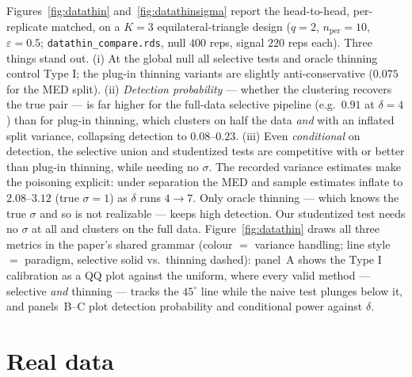 \documentclass[11pt]{article}
\begin{document}
Figures~\ref{fig:datathin} and~\ref{fig:datathinsigma} report the head-to-head,
per-replicate matched, on a $K=3$ equilateral-triangle design ($q=2$,
$n_{\mathrm{per}}=10$, $\varepsilon=0.5$; \texttt{datathin\_compare.rds}, null
$400$ reps, signal $220$ reps each). Three things stand out. (i) At the global null all selective tests
and oracle thinning control Type I; the plug-in thinning variants are slightly
anti-conservative ($0.075$ for the MED split). (ii) \emph{Detection probability}
--- whether the clustering recovers the true pair --- is far higher for the
full-data selective pipeline (e.g.\ $0.91$ at $\delta=4$) than for plug-in
thinning, which clusters on half the data \emph{and} with an inflated split
variance, collapsing detection to $0.08$--$0.23$. (iii) Even \emph{conditional} on
detection, the selective union and studentized tests are competitive with or
better than plug-in thinning, while needing no $\sigma$. The recorded variance
estimates make the poisoning explicit: under separation the MED and sample
estimates inflate to $2.08$--$3.12$ (true $\sigma=1$) as $\delta$ runs $4\to 7$.
Only oracle thinning --- which knows the true $\sigma$ and so is not realizable
--- keeps high detection. Our studentized test needs no $\sigma$ at all and
clusters on the full data. Figure~\ref{fig:datathin} draws all three metrics in
the paper's shared grammar (colour $=$ variance handling; line style $=$
paradigm, selective solid vs.\ thinning dashed): panel~A shows the Type I
calibration as a QQ plot against the uniform, where every valid method ---
selective \emph{and} thinning --- tracks the $45^\circ$ line while the naive test
plunges below it, and panels~B--C plot detection probability and conditional
power against $\delta$.


\section{Real data}
\label{sec:realdata}
\end{document}
